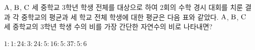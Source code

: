 $\mathrm{A}$, $\mathrm{B}$, $\mathrm{C}$ 세 중학교 $3$학년 학생 전체를 대상으로 하여 $2$회의 수학 경시 대회를 치룬 결과 각 중학교의 평균과 세 학교 전체 학생에 대한 평균은 다음 표와 같았다. $\mathrm{A}$, $\mathrm{B}$, $\mathrm{C}$ 세 중학교의 $3$학년 학생 수의 비를 가장 간단한 자연수의 비로 나타내면?\par\smallskip{}
\begin{choices32}{$1:1:2$}{$4:3:2$}{$4:5:1$}{$6:5:3$}{$7:5:6$}\end{choices32}
